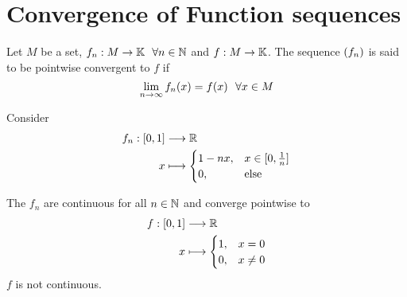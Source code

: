 \documentclass[../../script.tex]{subfiles}
\begin{document}
\section{Convergence of Function sequences}

\begin{defi}
    Let $M$ be a set, $f_n: M \rightarrow \mathbb{K} ~~\forall n \in \mathbb{N}$ and $f: M \rightarrow \mathbb{K}$. 
    The sequence $\left(f_n\right)$ is said to be pointwise convergent to $f$ if 
    \[
        \lim_{n \rightarrow \infty} f_n(x) = f(x) ~~\forall x \in M
    \]
\end{defi}

\begin{eg}
    Consider
    \begin{align*}
        f_n: [0, 1] &\longrightarrow \mathbb{R} \\
        x &\longmapsto \begin{cases}
            1 - nx, & x \in [0, \frac{1}{n}] \\
            0, & \text{else}
        \end{cases}
    \end{align*}

    \begin{center}
    \end{center}
    The $f_n$ are continuous for all $n \in \mathbb{N}$ and converge pointwise to 
    \begin{align*}
        f: [0, 1] &\longrightarrow \mathbb{R} \\
        x &\longmapsto \begin{cases}
            1, & x = 0 \\
            0, & x \ne 0
        \end{cases}
    \end{align*}
    $f$ is not continuous.
\end{eg}
\end{document}
